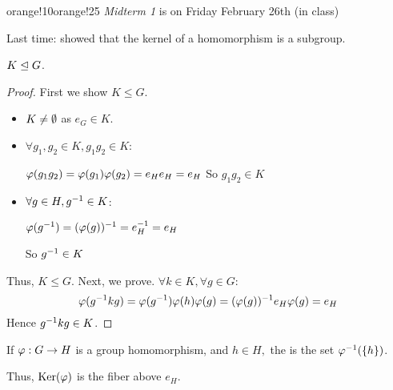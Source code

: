 \documentclass[notes.tex]{subfiles}
\begin{document}

\begin{classnote}{orange!10}{orange!25}
\emph{Midterm 1} is on Friday February 26th (in class)
\end{classnote}

Last time: showed that the kernel of a homomorphism is a subgroup.

\begin{proposition}
	$K\trianglelefteq G$.
\end{proposition}

\begin{proof}
	First we show $K\le G$.
	\begin{itemize}
		\item $K \ne \emptyset$ as $e_G\in K$.
		\item $\forall g_1, g_2\in K, g_1g_2\in K$:
		\begin{tabin}
			$\varphi(g_1g_2) = \varphi(g_1)\varphi(g_2) =e_He_H = e_H$
			So $g_1g_2\in K$
		\end{tabin}
		\item $\forall g\in H, {g}^{-1} \in K$:
		\begin{tabin}
			$\varphi({g}^{-1}) = (\varphi(g))^{-1} = {e}^{-1}_H = e_H$
		\end{tabin}
		So ${g}^{-1} \in K$
	\end{itemize}
	Thus, $K\le G$.
	Next, we prove.
	$\forall k\in K, \forall g\in G$:
		\[
			\varphi({g}^{-1}kg)
			= \varphi({g}^{-1})\varphi(h)\varphi(g)
			= (\varphi(g))^{-1}e_H\varphi(g)
			= e_H
		\]
	Hence ${g}^{-1}kg\in K$.
\end{proof}

\begin{defn}
	If $\varphi :G\to H$ is a group homomorphism, and $h\in H,$ the  is the set ${\varphi}^{-1}(\{h\})$.
\end{defn}

Thus, $\operatorname{\mathrm{Ker}}(\varphi)$ is the fiber above $e_H$.
\end{document}

